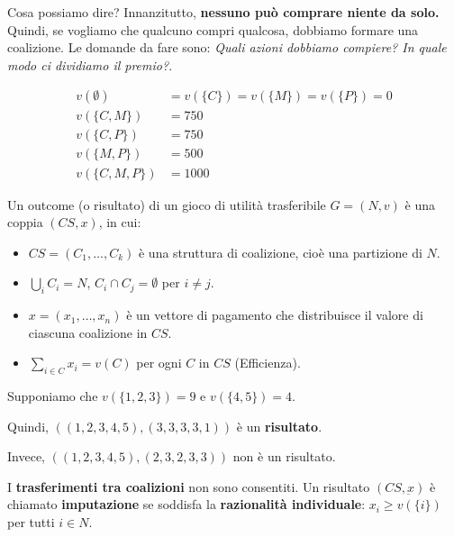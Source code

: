 Cosa possiamo dire? Innanzitutto, \textbf{nessuno può comprare niente da solo.}
Quindi, se vogliamo che qualcuno compri qualcosa, dobbiamo formare una
coalizione. Le domande da fare sono: \textit{Quali azioni dobbiamo compiere? In
    quale modo ci dividiamo il premio?}.

\begin{align*}
    v(\emptyset)   & = v(\{C\}) = v(\{M\}) = v(\{P\}) = 0 \\
    v(\{C, M\})    & = 750                                \\
    v(\{C, P\})    & = 750                                \\
    v(\{M, P\})    & = 500                                \\
    v(\{C, M, P\}) & = 1000
\end{align*}

\begin{definition}[Outcome]
    Un outcome (o risultato) di un gioco di utilità trasferibile $G = (N, v)$ è una coppia $(CS, x)$, in cui:
    \begin{itemize}
        \item $CS = (C_1, \ldots, C_k)$ è una struttura di coalizione, cioè una partizione di $N$.
        \item $\bigcup_i C_i = N$, $C_i \cap C_j = \emptyset$ per $i \neq j$.
        \item $x = (x_1, \ldots, x_n)$ è un vettore di pagamento che distribuisce il valore di ciascuna coalizione in $CS$.
        \item $\sum_{i \in C} x_i = v(C)$ per ogni $C$ in $CS$ (Efficienza).
    \end{itemize}

    Supponiamo che $v(\{1, 2, 3\}) = 9$ e $v(\{4, 5\}) = 4$.

    Quindi, $(({1, 2, 3}, {4, 5}), (3, 3, 3, 3, 1))$ è un \textbf{risultato}.

    Invece, $(({1, 2, 3}, {4, 5}), (2, 3, 2, 3, 3))$ non è un risultato.

    I \textbf{trasferimenti tra coalizioni} non sono consentiti. Un risultato $(CS,
        \underbar{x})$ è chiamato \textbf{imputazione} se soddisfa la
    \textbf{razionalità individuale}: $x_i \geq v(\{i\})$ per tutti $i \in N$.

\end{definition}

